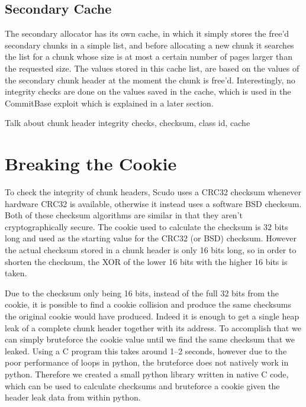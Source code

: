 \documentclass[a4paper,11pt,oneside]{report}
\begin{document}
\section{Secondary Cache}

The secondary allocator has its own cache, in which it simply stores the free'd secondary
chunks in a simple list, and before allocating a new chunk it searches the list for a
chunk whose size is at most a certain number of pages larger than the requested size. The
values stored in this cache list, are based on the values of the secondary chunk header at
the moment the chunk is free'd. Interestingly, no integrity checks are done on the values
saved in the cache, which is used in the CommitBase exploit which is explained in a later
section.




Talk about chunk header integrity checks, checksum, class id, cache

\chapter{Breaking the Cookie}

To check the integrity of chunk headers, Scudo uses a CRC32 checksum whenever hardware
CRC32 is available, otherwise it instead uses a software BSD checksum. Both of these
checksum algorithms are similar in that they aren't cryptographically secure. The cookie
used to calculate the checksum is 32 bits long and used as the starting value for the
CRC32 (or BSD) checksum.  However the actual checksum stored in a chunk header is only 16
bits long, so in order to shorten the checksum, the XOR of the lower 16 bits with the
higher 16 bits is taken.

Due to the checksum only being 16 bits, instead of the full 32 bits from the cookie, it is
possible to find a cookie collision and produce the same checksums the original cookie
would have produced. Indeed it is enough to get a single heap leak of a complete chunk
header together with its address. To accomplish that we can simply bruteforce the cookie
value until we find the same checksum that we leaked. Using a C program this takes around
1–2 seconds, however due to the poor performance of loops in python, the bruteforce does
not natively work in python. Therefore we created a small python library written in native
C code, which can be used to calculate checksums and bruteforce a cookie given the header
leak data from within python.
\end{document}
